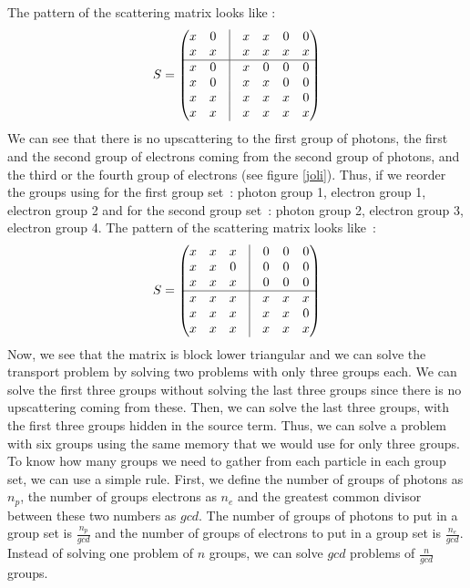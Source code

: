 The pattern of the scattering matrix looks like :
\begin{equation}
S =
\begin{pmatrix}
x & 0 & \vline & x & x & 0 & 0\\
x & x & \vline & x & x & x & x\\
\hline     
x & 0 & \vline & x & 0 & 0 & 0\\
x & 0 & \vline & x & x & 0 & 0\\
x & x & \vline & x & x & x & 0\\
x & x & \vline & x & x & x & x\\
\end{pmatrix}
\end{equation}
We can see that there is no upscattering to the first group of photons, the
first and the second group of electrons coming from the second group of
photons, and the third or the fourth group of electrons (see figure
\ref{joli}). Thus, if we reorder the groups using for the first group \hbox{set :} 
photon group 1, electron group 1, electron group 2 and for the second group 
\hbox{set :} photon group 2, electron group 3, electron group 4. The pattern 
of the scattering matrix looks \hbox{like :}
\begin{equation}
S =
\begin{pmatrix}
x & x & x & \vline & 0 & 0 & 0\\
x & x & 0 & \vline & 0 & 0 & 0\\
x & x & x & \vline & 0 & 0 & 0\\
\hline      
x & x & x & \vline & x & x & x\\
x & x & x & \vline & x & x & 0\\
x & x & x & \vline & x & x & x\\
\end{pmatrix}
\end{equation}
Now, we see that the matrix is block lower triangular and we can solve the
transport problem by solving two problems with only three groups each. 
We can solve the first three groups 
without solving the last three groups since there is no upscattering coming 
from these. Then, we can solve the last three groups, with the first three groups 
hidden in the source term. Thus, we can solve a problem with six groups using the 
same memory that we would use for only three groups. To know how many groups we 
need to gather from each particle in each group set, we can use a simple rule. 
First, we define the number of groups of photons as $n_p$, the number of groups 
electrons as $n_e$ and the greatest common divisor between these two numbers as 
$gcd$. The number of groups of photons to put in a group set is $\frac{n_p}{gcd}$ 
and the number of groups of electrons to put in a group set is $\frac{n_e}{gcd}$. 
Instead of solving one problem of $n$ groups, we can solve $gcd$ problems of 
$\frac{n}{gcd}$ groups.

